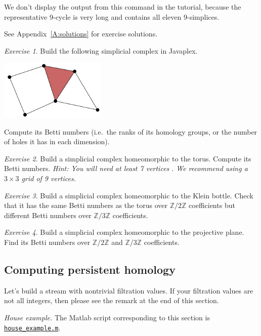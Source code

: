 \documentclass[amscd, amssymb, verbatim]{amsart}[12pt]
\theoremstyle{remark}
\newtheorem{exercise}{Exercise}
\theoremstyle{remark}
\theoremstyle{remark}
\newcommand{\Z}{\mathbb{Z}}
\begin{document}
We don't display the output from this command in the tutorial, because the representative 9-cycle is very long and contains all eleven 9-simplices.

See Appendix~\ref{A:solutions} for exercise solutions. 

\begin{exercise}
Build the following simplicial complex in Javaplex.
\begin{center}
\includegraphics[width=2in]{smallSimplicialComplex.png}
\end{center}
Compute its Betti numbers (i.e.\ the ranks of its homology groups, or the number of holes it has in each dimension).
\end{exercise}

\begin{exercise}
Build a simplicial complex homeomorphic to the torus. Compute its Betti numbers. {\em Hint: You will need at least 7 vertices} \citep[page 107]{Hatcher}{\em . We recommend using a $3\times 3$ grid of 9 vertices.} 
\end{exercise}

\begin{exercise}
Build a simplicial complex homeomorphic to the Klein bottle. Check that it has the same Betti numbers as the torus over $\Z/2\Z$ coefficients but different Betti numbers over $\Z/3\Z$ coefficients. 
\end{exercise}

\begin{exercise}
Build a simplicial complex homeomorphic to the projective plane. Find its Betti numbers over $\Z/2\Z$ and $\Z/3\Z$ coefficients. 
\end{exercise}


\subsection{Computing persistent homology}\label{S:computingPersistentHomology}

Let's build a stream with nontrivial filtration values. If your filtration values are not all integers, then please see the remark at the end of this section.

{\em House example.} The Matlab script corresponding to this section is \href{https://github.com/appliedtopology/javaplex/tree/master/src/matlab/for_distribution/tutorial_examples/house_example.m}{\texttt{house\_example.m}}.
\end{document}
